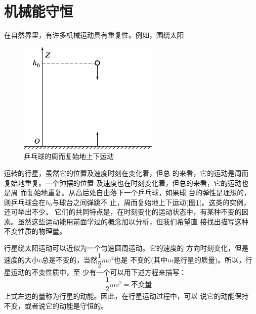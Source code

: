 \section{机械能守恒}\label{sec:06.01}

在自然界里，有许多机械运动具有重复性。例如，围绕太阳
\begin{figure}
  \centering
  \includegraphics{figure/fig06.01}\vspace{1em}
  \caption{乒乓球的周而复始地上下运动}
  \label{fig:06.01}
\end{figure}
运转的行星，虽然它的位置及速度时刻在变化着，但总
的来看，它的运动是周而复始地重复。一个钟摆的位置
及速度也在时刻变化着，但总的来看，它的运动也是周
而复始地重复。从高后处自由落下一个乒乓球，如果球
台的弹性是理想的，则乒乓球会在$ h _ { 0 } $与球台之间弹跳不
止，周而复始地上下运动(图\ref{fig:06.01})。这类的实例，还可举出不少。
它们的共同特点是，在时刻变化的运动状态中，有某种不变的因
素。虽然这些运动能用前面学过的概念加以分析，但我们希望直
接找出描写这种不变性质的物理量。

行星绕太阳运动可以近似为一个匀速圆周运动。它的速度的
方向时刻变化，但是速度的大小$ v $总是不变的，当然$ \dfrac { 1 } { 2 } m v ^ { 2 } $也是
\clearpage\noindent
不变的(其中$ m $是行星的质量)。所以，行星运动的不变性质中，至
少有一个可以用下述方程来描写：
\begin{equation}\label{eqn:06.01.01}
  \frac { 1 } { 2 } m v ^ { 2 } = \text{不变量}
\end{equation}
上式左边的量称为行星的动能。因此，在行星运动过程中，可以
说它的动能保持不变，或者说它的动能是守恒的。

